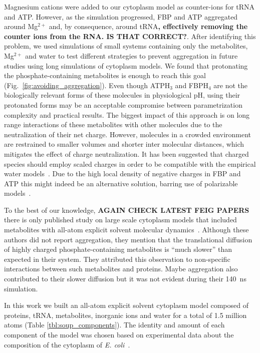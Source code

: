 \documentclass[journal=jcisd8,manuscript=article]{achemso}
\begin{document}
Magnesium cations were added to our cytoplasm model as counter-ions
for tRNA and ATP. However, as the simulation progressed, FBP and ATP
aggregated around Mg$^{2+}$ and, by consequence, around tRNA{\bf,
  effectively removing the counter ions from the RNA. IS THAT
  CORRECT?}. After identifying this problem, we used simulations of
small systems containing only the metabolites, Mg$^{2+}$ and water to
test different strategies to prevent aggregation in future studies
using long simulations of cytoplasm models. We found that protonating
the phosphate-containing metabolites is enough to reach this goal
(Fig.~\ref{fig:avoiding_aggregation}). Even though ATPH$_3$ and
FBPH$_4$ are not the biologically relevant forms of these molecules in
physiological pH, using their protonated forms may be an acceptable
compromise between parametrization complexity and practical
results. The biggest impact of this approach is on long range
interactions of these metabolites with other molecules due to the
neutralization of their net charge. However, molecules in a crowded
environment are restrained to smaller volumes and shorter inter
molecular distances, which mitigates the effect of charge
neutralization. It has been suggested that charged species should
employ scaled charges in order to be compatible with the empirical
water models~\cite{Leontyev2009a,Leontyev2011a}. Due to the high local
density of negative charges in FBP and ATP this might indeed be an
alternative solution, barring use of polarizable
models~\cite{Ponder2010a,Lopes2013a,Ghahremanpour2018b,Walz2018a}.


To the best of our knowledge, {\bf AGAIN CHECK LATEST FEIG PAPERS}
there is only published study on large scale cytoplasm models that
included metabolites with all-atom explicit solvent molecular
dynamics~\cite{Yu2016a}. Although these authors did not report
aggregation, they mention that the translational diffusion of highly
charged phosphate-containing metabolites is ``much slower'' than
expected in their system. They attributed this observation to
non-specific interactions between such metabolites and proteins. Maybe
aggregation also contributed to their slower diffusion but it was not
evident during their \SI{140}{\nano\second} simulation.


In this work we built an all-atom explicit solvent cytoplasm model
composed of proteins, tRNA, metabolites, inorganic ions and water for a total
of 1.5 million atoms (Table \ref{tbl:soup_components}). The identity
and amount of each component of the model was chosen based on
experimental data about the composition of the cytoplasm of
\textit{E. coli}~\cite{Dong1996,Bennett2009,Link1997,Mcguffee2010}.
\end{document}
